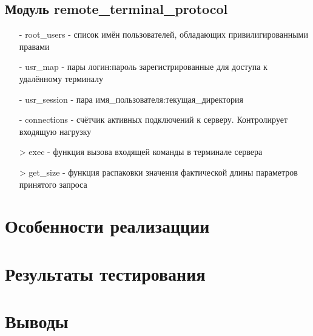 \subsection{Модуль remote_terminal_protocol}
\begin{itemize}
\item[-] root_users - список имён пользователей, обладающих привилигированными правами
\item[-] usr_map - пары логин:пароль зарегистрированные для доступа к удалённому терминалу
\item[-] usr_session - пара имя_пользователя:текущая_директория
\item[-] connections - счётчик активных подключений к серверу. Контролирует входящую нагрузку 
\item[>] exec - функция вызова входящей команды в терминале сервера
\item[>] get_size - функция распаковки значения фактической длины параметров принятого запроса
\end{itemize}

\section{Особенности реализацции}

\section{Результаты тестирования}

\section{Выводы}




